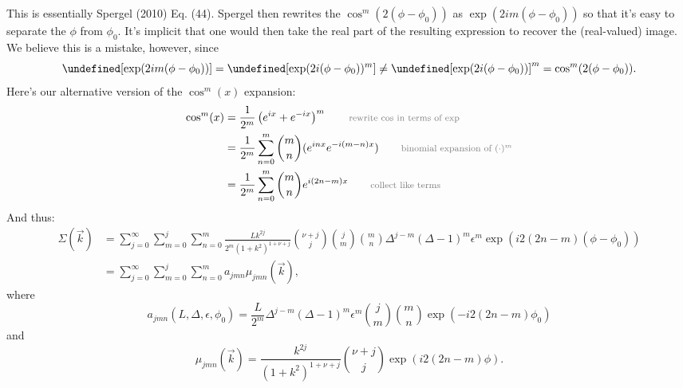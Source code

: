 \documentclass{article}
\newcommand*{\annot}[1]{\tag*{\footnotesize{\textcolor{gray}{#1}}}}
\let\Re\undefined
\DeclareMathOperator{\Re}{Re}
\begin{document}
This is essentially Spergel (2010) Eq. (44).
Spergel then rewrites the $\cos^m(2 (\phi-\phi_0))$ as $\exp(2 i m (\phi-\phi_0))$ so that it's easy to separate the $\phi$ from $\phi_0$.
It's implicit that one would then take the real part of the resulting expression to recover the (real-valued) image.
We believe this is a mistake, however, since
\begin{equation}
  \Re[\exp(2 i m (\phi-\phi_0))] = \Re[\exp(2 i (\phi-\phi_0))^m] \ne \Re[\exp(2 i (\phi-\phi_0))]^m = \cos^m(2 (\phi-\phi_0)).
\end{equation}
Here's our alternative version of the $\cos^m(x)$ expansion:
\begin{align}
  \cos^m(x)
  &= \frac{1}{2^m}\left(e^{ix} + e^{-ix}\right)^m
  \annot{rewrite $\cos$ in terms of $\exp$} \\
  &= \frac{1}{2^m} \sum_{n=0}^{m}\binom{m}{n}(e^{i n x} e^{-i (m-n) x})
  \annot{binomial expansion of $(\cdot)^m$} \\
  &= \frac{1}{2^m} \sum_{n=0}^{m}\binom{m}{n}e^{i (2n-m) x}
  \annot{collect like terms}
\end{align}
And thus:
\begin{equation}
  \begin{split}
    \label{eqn:sum}
    \Sigma(\vec{k}) & = \sum_{j=0}^{\infty}\sum_{m=0}^{j}\sum_{n=0}^{m}\frac{L k^{2j}}{2^m(1+k^2)^{1+\nu+j}}\binom{\nu+j}{j}\binom{j}{m}\binom{m}{n}\Delta^{j-m}(\Delta-1)^m\epsilon^m\exp(i 2 (2n-m) (\phi-\phi_0)) \\
    & = \sum_{j=0}^{\infty}\sum_{m=0}^{j}\sum_{n=0}^{m} a_{jmn}\mu_{jmn}(\vec{k}),
  \end{split}
\end{equation}
where
\begin{equation}
  a_{jmn}(L, \Delta, \epsilon, \phi_0) = \frac{L}{2^m} \Delta^{j-m}(\Delta-1)^m\epsilon^m\binom{j}{m}\binom{m}{n}\exp(-i 2 (2n-m) \phi_0)
\end{equation}
and
\begin{equation}
  \mu_{jmn}(\vec{k}) = \frac{k^{2j}}{(1+k^2)^{1+\nu+j}}\binom{\nu+j}{j}\exp(i 2 (2n-m) \phi).
\end{equation}
\end{document}
